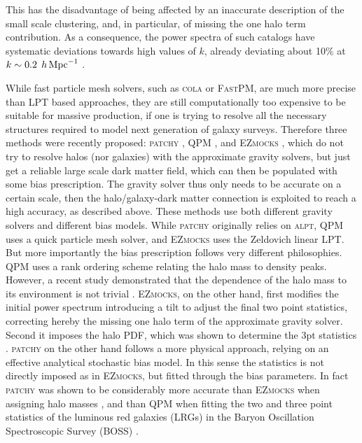 \documentclass[english,usenatbib]{mn2e}
\newcommand{\hperm}{\,h\,{\rm Mpc}^{-1}}
\begin{document}
This has the disadvantage of being affected by an inaccurate description of the small scale clustering, and, in particular, of missing the one halo term contribution. As a consequence, the power spectra of such catalogs have systematic deviations towards high values of $k$, already deviating about 10$\%$ at $k\sim0.2\; \hperm$ \citep[][]{monaco2013}.

While fast particle mesh solvers, such as \textsc{cola} or \textsc{FastPM}, are much more precise than LPT based approaches, they are  still computationally too expensive to be suitable for massive production, if one is trying to resolve all the necessary structures required to model next generation of galaxy surveys.
Therefore three methods were recently proposed: \textsc{patchy} \citep{kitaura2014}, \textsc{QPM} \citep{qpm}, and \textsc{EZmocks} \citep{eazymock}, which do not try to resolve halos (nor galaxies) with the approximate gravity solvers, but just get a reliable large scale dark matter field, which can then be populated with some bias prescription. The gravity solver thus only needs to be accurate on a certain scale, then the halo/galaxy-dark matter connection is exploited to reach a high accuracy, as described above.
These methods use both different gravity solvers and different bias models. While \textsc{patchy} originally relies on \textsc{alpt}, \textsc{QPM} uses a quick particle mesh solver, and \textsc{EZmocks} uses the Zeldovich linear LPT.
But more importantly the bias prescription follows very different philosophies. \textsc{QPM} uses a rank ordering scheme relating the halo mass to density peaks. However, a recent study  demonstrated  that the dependence of the halo mass to its environment is not trivial \citep[see][]{zhao2015}.  \textsc{EZmocks}, on the other hand, first modifies the initial power spectrum introducing a tilt to adjust the final two point statistics, correcting hereby the missing one halo term of the approximate gravity solver. Second it imposes the halo PDF, which was shown to determine the 3pt statistics \citep{kitaura2015}.
\textsc{patchy} on the other hand follows a more physical approach, relying on an effective analytical stochastic bias model. 
In this sense the statistics is not directly imposed as in \textsc{EZmocks}, but fitted through the bias parameters. In fact \textsc{patchy} was shown to be considerably more accurate than \textsc{EZmocks} when assigning halo masses \citep{zhao2015}, and than \textsc{QPM} when fitting the two and three point statistics of the luminous red galaxies (LRGs) in the Baryon Oscillation Spectroscopic Survey (BOSS)  \citep{kitaura2016}. 
\end{document}
